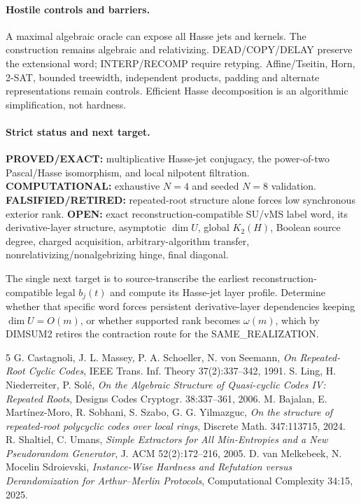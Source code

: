 \documentclass[11pt]{article}
\begin{document}
\paragraph{Hostile controls and barriers.}
A maximal algebraic oracle can expose all Hasse jets and kernels. The construction remains algebraic and relativizing. DEAD/COPY/DELAY preserve the extensional word; INTERP/RECOMP require retyping. Affine/Tseitin, Horn, 2-SAT, bounded treewidth, independent products, padding and alternate representations remain controls. Efficient Hasse decomposition is an algorithmic simplification, not hardness.

\paragraph{Strict status and next target.}
\textbf{PROVED/EXACT:} multiplicative Hasse-jet conjugacy, the power-of-two Pascal/Hasse isomorphism, and local nilpotent filtration.
\textbf{COMPUTATIONAL:} exhaustive \(N=4\) and seeded \(N=8\) validation.
\textbf{FALSIFIED/RETIRED:} repeated-root structure alone forces low synchronous exterior rank.
\textbf{OPEN:} exact reconstruction-compatible SU/vMS label word, its derivative-layer structure, asymptotic \(\dim U\), global \(K_2(H)\), Boolean source degree, charged acquisition, arbitrary-algorithm transfer, nonrelativizing/nonalgebrizing hinge, final diagonal.

The single next target is to source-transcribe the earliest reconstruction-compatible legal \(b_j(t)\) and compute its Hasse-jet layer profile. Determine whether that specific word forces persistent derivative-layer dependencies keeping \(\dim U=O(m)\), or whether supported rank becomes \(\omega(m)\), which by DIMSUM2 retires the contraction route for the SAME\_REALIZATION.

\begin{thebibliography}{5}
 G. Castagnoli, J. L. Massey, P. A. Schoeller, N. von Seemann, \emph{On Repeated-Root Cyclic Codes}, IEEE Trans. Inf. Theory 37(2):337--342, 1991.
 S. Ling, H. Niederreiter, P. Sol\'e, \emph{On the Algebraic Structure of Quasi-cyclic Codes IV: Repeated Roots}, Designs Codes Cryptogr. 38:337--361, 2006.
 M. Bajalan, E. Mart\'inez-Moro, R. Sobhani, S. Szabo, G. G. Yilmazguc, \emph{On the structure of repeated-root polycyclic codes over local rings}, Discrete Math. 347:113715, 2024.
 R. Shaltiel, C. Umans, \emph{Simple Extractors for All Min-Entropies and a New Pseudorandom Generator}, J. ACM 52(2):172--216, 2005.
 D. van Melkebeek, N. Mocelin Sdroievski, \emph{Instance-Wise Hardness and Refutation versus Derandomization for Arthur--Merlin Protocols}, Computational Complexity 34:15, 2025.
\end{thebibliography}
\end{document}
